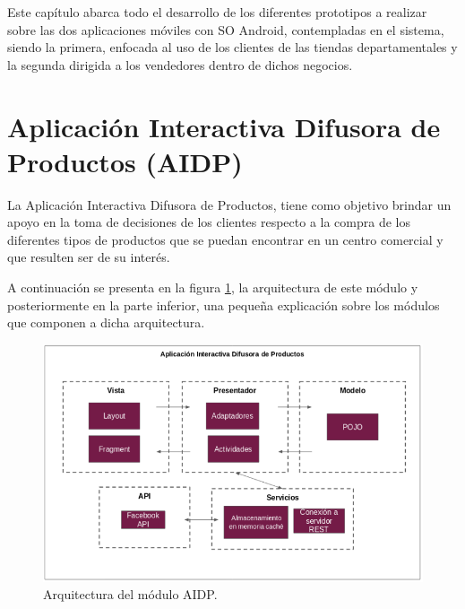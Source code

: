 Este capítulo abarca todo el desarrollo de los diferentes prototipos a realizar sobre las dos aplicaciones móviles con SO Android, contempladas en el sistema, siendo la primera, enfocada al uso de los clientes de las tiendas departamentales y la segunda dirigida a los vendedores dentro de dichos negocios.

\section{Aplicación Interactiva Difusora de Productos (AIDP)}
La Aplicación Interactiva Difusora de Productos, tiene como objetivo brindar un apoyo en la toma de decisiones de los clientes respecto a la compra de los diferentes tipos de productos que se puedan encontrar en un centro comercial y que resulten ser de su interés.

A continuación se presenta en la figura \ref{image:arquitecturaAIDP}, la arquitectura de este módulo y posteriormente en la parte inferior, una pequeña explicación sobre los módulos que componen a dicha arquitectura.
\FloatBarrier
\begin{figure}[htbp!]
		\centering
			\includegraphics[width=.9 \textwidth]{imagenes/Arquitecturas/arquiCliente}
		\caption{Arquitectura del módulo AIDP.}
		\label{image:arquitecturaAIDP}
\end{figure}
\FloatBarrier


